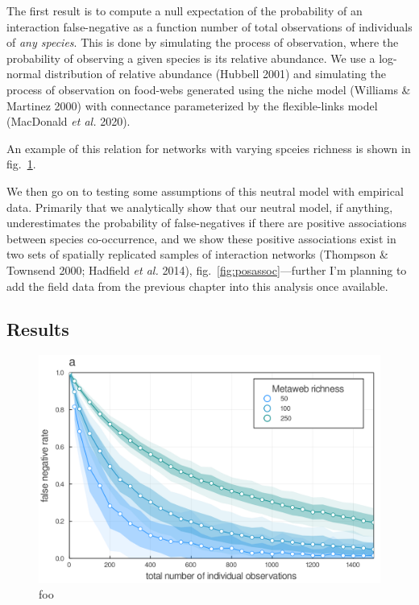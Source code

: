 \documentclass[11pt]{article}
\makeatletter
\def\maxwidth{\ifdim\Gin@nat@width>\linewidth\linewidth
\else\Gin@nat@width\fi}
\let\Oldincludegraphics\includegraphics
\renewcommand{\includegraphics}[1]{\Oldincludegraphics[width=\maxwidth]{#1}}
\makeatother
\begin{document}
The first result is to compute a null expectation of the probability of
an interaction false-negative as a function number of total observations
of individuals of \emph{any species}. This is done by simulating the
process of observation, where the probability of observing a given
species is its relative abundance. We use a log-normal distribution of
relative abundance (Hubbell 2001) and simulating the process of
observation on food-webs generated using the niche model (Williams \&
Martinez 2000) with connectance parameterized by the flexible-links
model (MacDonald \emph{et al.} 2020).

An example of this relation for networks with varying spceies richness
is shown in fig.~\ref{fig:fnr}.

We then go on to testing some assumptions of this neutral model with
empirical data. Primarily that we analytically show that our neutral
model, if anything, underestimates the probability of false-negatives if
there are positive associations between species co-occurrence, and we
show these positive associations exist in two sets of spatially
replicated samples of interaction networks (Thompson \& Townsend 2000;
Hadfield \emph{et al.} 2014), fig.~\ref{fig:posassoc}---further I'm
planning to add the field data from the previous chapter into this
analysis once available.

\hypertarget{results}{%
\subsection{Results}\label{results}}

\begin{figure}
\hypertarget{fig:fnr}{%
\centering
\includegraphics{./figures/ch2_fnr.png}
\caption{foo}\label{fig:fnr}
}
\end{figure}
\end{document}
